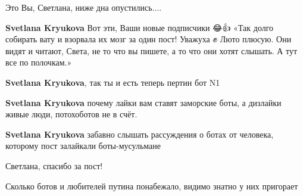 \begin{itemize}
\begin{itemize}
Это Вы, Светлана, ниже дна опустились....

 
\textbf{Svetlana Kryukova}
Вот эти, Ваши новые подписчики 😂👍
«Так долго собирать вату и взорвала их мозг за один пост! Уважуха ✊ Люто плюсую.
Они видят и читают, Света, не то что вы пишете, а то что они хотят слышать. А тут все по полочкам.»

 
\textbf{Svetlana Kryukova}, так ты и есть теперь пертин бот N1

 
\textbf{Svetlana Kryukova} почему лайки вам ставят заморские боты, а дизлайки живые люди, потохоботов не в счёт.

 
\textbf{Svetlana Kryukova} забавно слышать рассуждения о ботах от человека, которому пост залайкали боты-мусульмане🤣

\end{itemize}

 

Светлана, спасибо за пост!

Сколько ботов и любителей путина понабежало, видимо знатно у них пригорает \Laughey[1.0][white]

\begin{itemize}
 

\end{itemize}
\end{itemize}
